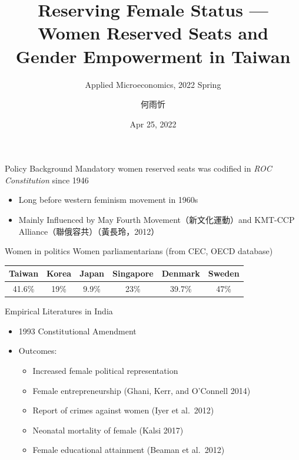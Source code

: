 \documentclass[
  10pt,
  ignorenonframetext,
  aspectratio=43,
]{beamer}
\title{Reserving Female Status --- Women Reserved Seats and Gender
Empowerment in Taiwan}
\subtitle{Applied Microeconomics, 2022 Spring}
\author{何雨忻}
\date{Apr 25, 2022}
\institute{Department of Economics, National Taiwan University}
\providecommand{\tightlist}{%
  \setlength{\itemsep}{0pt}\setlength{\parskip}{0pt}}
\begin{document}
\frame{\titlepage}

\begin{frame}{Policy Background}
\protect\hypertarget{policy-background}{}
Mandatory women reserved seats was codified in \emph{ROC Constitution}
since 1946

\begin{itemize}
\tightlist
\item
  Long before western feminism movement in 1960s
\item
  Mainly Influenced by May Fourth Movement（新文化運動）and KMT-CCP
  Alliance（聯俄容共）（黃長玲，2012）
\end{itemize}

\begin{block}{Women in politics}
\protect\hypertarget{women-in-politics}{}
Women parliamentarians (from CEC, OECD database)

\begin{longtable}[]{@{}cccccc@{}}
\toprule
Taiwan & Korea & Japan & Singapore & Denmark & Sweden \\
\midrule
\endhead
41.6\% & 19\% & 9.9\% & 23\% & 39.7\% & 47\% \\
\bottomrule
\end{longtable}
\end{block}
\end{frame}

\begin{frame}{Empirical Literatures in India}
\protect\hypertarget{empirical-literatures-in-india}{}
\begin{itemize}
\tightlist
\item
  1993 Constitutional Amendment
\item
  Outcomes:

  \begin{itemize}
  \tightlist
  \item
    Increased female political representation
  \item
    Female entrepreneurship \footnotesize (Ghani, Kerr, and O'Connell
    2014) \normalsize
  \item
    Report of crimes against women \footnotesize (Iyer et al.~2012)
    \normalsize
  \item
    Neonatal mortality of female \footnotesize (Kalsi 2017) \normalsize
  \item
    Female educational attainment \footnotesize (Beaman et al.~2012)
    \normalsize
  \end{itemize}
\end{itemize}
\end{frame}
\end{document}
